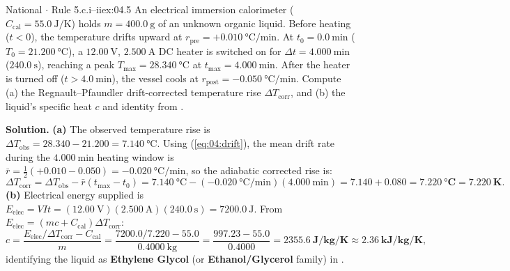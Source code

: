 \begin{workedexample}{National $\cdot$ Rule 5.c.i--ii}{ex:04.5}
An electrical immersion calorimeter ($C_{\mathrm{cal}} = \SI{55.0}{\joule\per\kelvin}$) holds $m = \SI{400.0}{\gram}$ of an unknown organic liquid. Before heating ($t < 0$), the temperature drifts upward at $r_{\mathrm{pre}} = +\SI{0.010}{\celsius\per\minute}$. At $t_0 = \SI{0.0}{\minute}$ ($T_0 = \SI{21.200}{\celsius}$), a $\SI{12.00}{\volt}$, $\SI{2.500}{\ampere}$ DC heater is switched on for $\Delta t = \SI{4.000}{\minute}$ ($\SI{240.0}{\second}$), reaching a peak $T_{\max} = \SI{28.340}{\celsius}$ at $t_{\max} = \SI{4.000}{\minute}$. After the heater is turned off ($t > \SI{4.0}{\minute}$), the vessel cools at $r_{\mathrm{post}} = -\SI{0.050}{\celsius\per\minute}$. Compute (a) the Regnault--Pfaundler drift-corrected temperature rise $\Delta T_{\mathrm{corr}}$, and (b) the liquid's specific heat $c$ and identity from .

\textbf{Solution.}
\textbf{(a)} The observed temperature rise is $\Delta T_{\mathrm{obs}} = 28.340 - 21.200 = \SI{7.140}{\celsius}$. Using (\ref{eq:04:drift}), the mean drift rate during the $\SI{4.000}{\minute}$ heating window is $\bar{r} = \frac{1}{2}(+0.010 - 0.050) = -\SI{0.020}{\celsius\per\minute}$, so the adiabatic corrected rise is:
\[
  \Delta T_{\mathrm{corr}} = \Delta T_{\mathrm{obs}} - \bar{r}(t_{\max} - t_0) = \SI{7.140}{\celsius} - (-\SI{0.020}{\celsius\per\minute})(\SI{4.000}{\minute}) = 7.140 + 0.080 = \mathbf{\SI{7.220}{\celsius} = \SI{7.220}{\kelvin}}.
\]
\textbf{(b)} Electrical energy supplied is $E_{\mathrm{elec}} = V I t = (\SI{12.00}{\volt})(\SI{2.500}{\ampere})(\SI{240.0}{\second}) = \SI{7200.0}{\joule}$. From $E_{\mathrm{elec}} = (m c + C_{\mathrm{cal}})\Delta T_{\mathrm{corr}}$:
\[
  c = \frac{E_{\mathrm{elec}}/\Delta T_{\mathrm{corr}} - C_{\mathrm{cal}}}{m} = \frac{7200.0/7.220 - 55.0}{\SI{0.4000}{\kilogram}} = \frac{997.23 - 55.0}{0.4000} = \mathbf{\SI{2355.6}{\joule\per\kilogram\per\kelvin} \approx \SI{2.36}{\kilo\joule\per\kilogram\per\kelvin}},
\]
identifying the liquid as \textbf{Ethylene Glycol} (or \textbf{Ethanol/Glycerol} family) in .
\end{workedexample}

